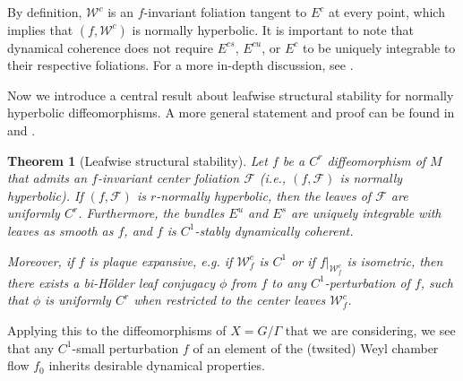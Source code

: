 \documentclass[11pt]{amsart}
\numberwithin{equation}{section}
\newcommand{\W}{\mathcal{W}}
\theoremstyle{plain}
\newtheorem{thm}{Theorem}[section]
\begin{document}
By definition, $\mathcal{W}^c$ is an $f$-invariant foliation tangent to $E^c$ at every point, which implies that $(f,\mathcal{W}^c)$ is normally hyperbolic. It is important to note that dynamical coherence does not require $E^{cs}$, $E^{cu}$, or $E^c$ to be uniquely integrable to their respective foliations. For a more in-depth discussion, see \cite{BWcoh}.

Now we introduce a central result about leafwise structural stability for normally hyperbolic diffeomorphisms. A more general statement and proof can be found in \cite{BWcoh} and \cite{PSWholrev}.

\begin{thm}[Leafwise structural stability]\label{leafconj}
Let $f$ be a $C^r$ diffeomorphism of $M$ that admits an $f$-invariant center foliation $\mathcal{F}$ (i.e., $(f,\mathcal{F})$ is normally hyperbolic). If $(f,\mathcal{F})$ is $r$-normally hyperbolic, then the leaves of $\mathcal{F}$ are uniformly $C^r$. Furthermore, the bundles $E^u$ and $E^s$ are uniquely integrable with leaves as smooth as $f$, and $f$ is $C^1$-stably dynamically coherent.

Moreover, if $f$ is plaque expansive, e.g. if $\W^c_f$ is $C^1$ or if $f|_{\W^c_f}$ is isometric, then there exists a bi-H\"older leaf conjugacy $\phi$ from $f$ to any $C^1$-perturbation of $f$, such that $\phi$ is uniformly $C^r$ when restricted to the center leaves $\mathcal{W}^c_f$.
\end{thm}

Applying this to the diffeomorphisms of $X = G/\Gamma$ that we are considering, we see that any $C^1$-small perturbation $f$ of an element of the (twsited) Weyl chamber flow $f_0$ inherits desirable dynamical properties.
\end{document}
